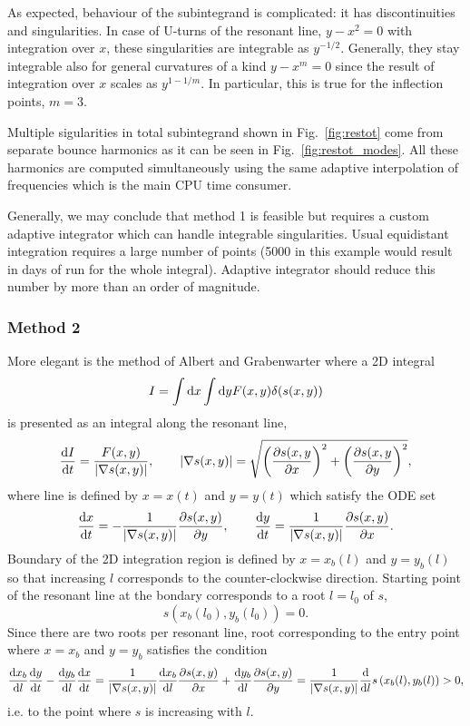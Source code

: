 \documentclass[preprint,prb,aps]{revtex4-1}
\newcommand{\be}[1]{\begin{equation} \label{#1}}
\newcommand{\ee}{\end{equation}}
\newcommand{\difp}[2]{\frac{\partial #1}{\partial #2}}
\newcommand{\rd}{{\rm d}}
\begin{document}
As expected, behaviour of the subintegrand is complicated: it has discontinuities 
and singularities. In case of U-turns of the resonant line, 
$y-x^2=0$ with integration over $x$, these singularities are integrable as $y^{-1/2}$.
Generally, they stay integrable also for general curvatures of a kind $y-x^m=0$
since the result of integration over $x$ scales as $y^{1-1/m}$. In particular, 
this is true for the inflection points, $m=3$.

Multiple sigularities in total subintegrand shown in Fig.~\ref{fig:restot}
come from separate bounce harmonics as it can be seen in Fig.~\ref{fig:restot_modes}.
All these harmonics are computed simultaneously using the same adaptive interpolation
of frequencies which is the main CPU time consumer.

Generally, we may conclude that method 1 is feasible but requires a custom adaptive
integrator which can handle integrable singularities. Usual equidistant integration
requires a large number of points (5000 in this example would result in days of run
for the whole integral). Adaptive integrator should reduce this number by more than 
an order of magnitude.


\subsubsection{Method 2}
More elegant is the method of Albert and Grabenwarter where a 2D integral
\be{AG_I}
I=\int \rd x \int \rd y F(x,y) \delta(s(x,y))
\ee
is presented as an integral along the resonant line,
\be{AG_alongres}
\frac{\rd I}{\rd t}=\frac{F(x,y)}{|\nabla s(x,y)|},
\qquad
|\nabla s(x,y)|=\sqrt{\left(\difp{s(x,y}{x}\right)^2
+\left(\difp{s(x,y}{y}\right)^2},
\ee
where line is defined by $x=x(t)$ and $y=y(t)$ which satisfy the ODE set
\be{AG_line}
\frac{\rd x}{\rd t}=-\frac{1}{|\nabla s(x,y)|}\difp{s(x,y)}{y},
\qquad
\frac{\rd y}{\rd t}=\frac{1}{|\nabla s(x,y)|}\difp{s(x,y)}{x}.
\ee
Boundary of the 2D integration region is defined by $x=x_b(l)$ and $y=y_b(l)$
so that increasing $l$ corresponds to the counter-clockwise direction. Starting
point of the resonant line at the bondary corresponds to a root $l=l_0$ of $s$,
\be{AG_start}
s\left(x_b(l_0),y_b(l_0)\right)=0.
\ee
Since there are two roots per resonant line, root corresponding to the entry point
where $x=x_b$ and $y=y_b$ satisfies the condition
\be{AG_choice}
\frac{\rd x_b}{\rd l}\frac{\rd y}{\rd t}-\frac{\rd y_b}{\rd l}\frac{\rd x}{\rd t}
=\frac{1}{|\nabla s(x,y)|}
\frac{\rd x_b}{\rd l}\difp{s(x,y)}{x}+\frac{\rd y_b}{\rd l}\difp{s(x,y)}{y}
=\frac{1}{|\nabla s(x,y)|} \frac{\rd}{\rd l}s\left(x_b(l),y_b(l)\right)>0,
\ee
i.e. to the point where $s$ is increasing with $l$.
\end{document}
